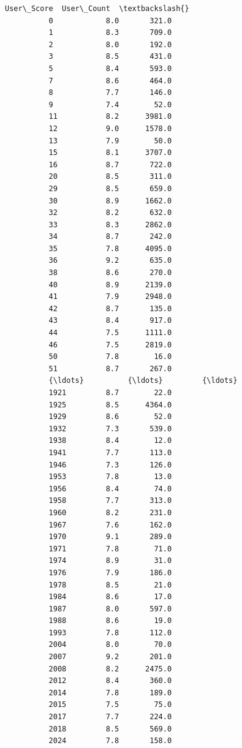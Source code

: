\documentclass[11pt]{article}
\begin{document}
\begin{Verbatim}[commandchars=\\\{\}]
                User\_Score  User\_Count  \textbackslash{}
          0            8.0       321.0   
          1            8.3       709.0   
          2            8.0       192.0   
          3            8.5       431.0   
          5            8.4       593.0   
          7            8.6       464.0   
          8            7.7       146.0   
          9            7.4        52.0   
          11           8.2      3981.0   
          12           9.0      1578.0   
          13           7.9        50.0   
          15           8.1      3707.0   
          16           8.7       722.0   
          20           8.5       311.0   
          29           8.5       659.0   
          30           8.9      1662.0   
          32           8.2       632.0   
          33           8.3      2862.0   
          34           8.7       242.0   
          35           7.8      4095.0   
          36           9.2       635.0   
          38           8.6       270.0   
          40           8.9      2139.0   
          41           7.9      2948.0   
          42           8.7       135.0   
          43           8.4       917.0   
          44           7.5      1111.0   
          46           7.5      2819.0   
          50           7.8        16.0   
          51           8.7       267.0   
          {\ldots}          {\ldots}         {\ldots}   
          1921         8.7        22.0   
          1925         8.5      4364.0   
          1929         8.6        52.0   
          1932         7.3       539.0   
          1938         8.4        12.0   
          1941         7.7       113.0   
          1946         7.3       126.0   
          1953         7.8        13.0   
          1956         8.4        74.0   
          1958         7.7       313.0   
          1960         8.2       231.0   
          1967         7.6       162.0   
          1970         9.1       289.0   
          1971         7.8        71.0   
          1974         8.9        31.0   
          1976         7.9       186.0   
          1978         8.5        21.0   
          1984         8.6        17.0   
          1987         8.0       597.0   
          1988         8.6        19.0   
          1993         7.8       112.0   
          2004         8.0        70.0   
          2007         9.2       201.0   
          2008         8.2      2475.0   
          2012         8.4       360.0   
          2014         7.8       189.0   
          2015         7.5        75.0   
          2017         7.7       224.0   
          2018         8.5       569.0   
          2024         7.8       158.0   
          

\end{Verbatim}
\end{document}
